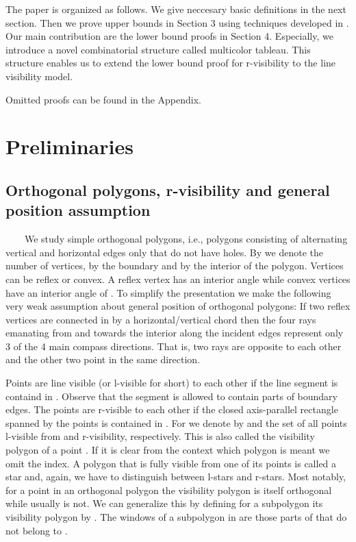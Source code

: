 \documentclass[a4paper,USenglish,numberwithinsect]{lipics}
\theoremstyle{plain}
\begin{document}
The paper is organized as follows. We give neccesary basic definitions in the next section. Then we prove upper bounds in Section 3 using techniques developed 
in \cite{BS, B_etal}. Our main contribution are the lower bound proofs in Section 4. Especially, we introduce a novel combinatorial structure called multicolor tableau.
 This structure enables us to extend the lower bound proof for r-visibility
to the line visibility model.

Omitted proofs can be found in the Appendix.

\section{Preliminaries}
\subsection{Orthogonal polygons, r-visibility and general position assumption}
\ \ \ \ We study simple orthogonal polygons, i.e., polygons   consisting of
alternating  vertical and horizontal edges only that do not have holes.
By  we denote the number of vertices, by   the boundary
and by  the interior of the polygon.
Vertices can be reflex or convex. A reflex vertex has an interior angle 
 while convex vertices have an interior angle of . To
simplify the presentation we make the following very weak assumption
about general position of orthogonal polygons: If two reflex vertices
 are connected in  by a horizontal/vertical chord
then the four rays emanating from  and  towards the interior along
the incident edges represent only 3 of the 4 main compass directions.
That is, two rays are opposite to each other and the other two point in
the same direction. 

Points  are line visible (or l-visible for short) to each
other if the line segment  is containd in . Observe that the
segment  is allowed
to contain parts of boundary edges. The points  are r-visible to
each other if the closed axis-parallel rectangle  spanned by the points is contained
in . 
For  we denote by  and
 the set of all points l-visible
from   and r-visibility, respectively. This is also called the
visibility polygon of a point . If it is clear from the context
which polygon is meant we omit the index.  A polygon that is fully
visible from one of its points is called a star and, again, we have to
distinguish between l-stars and r-stars. Most notably, for a point 
in an orthogonal polygon the visibility polygon 
is itself orthogonal while  usually is not. We can generalize
this by defining
for a subpolygon  its visibility polygon by
. The windows of a subpolygon  in 
are those parts of  
 that do not belong to .
\end{document}
